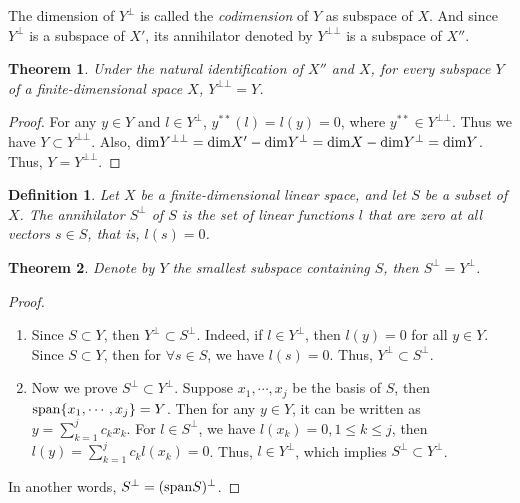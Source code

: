 \documentclass[11pt]{book}
\newtheorem{definition}{Definition}[section]
\newtheorem{theorem}{Theorem}[section]
\theoremstyle{definition}
\numberwithin{equation}{subsection}
\begin{document}
\medskip

The dimension of $Y^\bot$ is called the \emph{codimension} of $Y$ as subspace of $X$. And since $Y^\bot$ is a subspace of $X'$, its annihilator denoted by $Y^{\bot \bot}$ is a subspace of $X''$.

\medskip

\begin{theorem}
Under the natural identification of $X''$ and $X$, for every subspace $Y$ of a finite-dimensional space $X$, $Y^{\bot\bot} = Y$.
\end{theorem}
\begin{proof}
For any $y\in Y$ and $l\in Y^\bot$, $y^{**}(l) = l(y) = 0$, where $y^{**} \in Y^{\bot\bot}$. Thus we have $Y\subset Y^{\bot\bot}$. Also, ${\rm dim}Y^{\bot\bot} = {\rm dim}X' - {\rm dim}Y^\bot = {\rm dim}X - {\rm dim}Y^\bot = {\rm dim}Y$. Thus, $Y = Y^{\bot\bot}$.
\end{proof}

\medskip

\begin{definition}
Let $X$ be a finite-dimensional linear space, and let $S$ be a subset of $X$. The annihilator $S^\bot$ of $S$ is the set of linear functions $l$ that are zero at all vectors $s\in S$, that is, $l(s) = 0$. 
\end{definition}

\medskip

\begin{theorem}
Denote by $Y$ the smallest subspace containing $S$, then $S^\bot = Y^\bot$.
\end{theorem}
\begin{proof}
~\begin{enumerate}[label=(\arabic*)]
    \item Since $S\subset Y$, then $Y^\bot\subset S^\bot$. Indeed, if $l\in Y^\bot$, then $l(y) = 0$ for all $y\in Y$. Since $S\subset Y$, then for $\forall s\in S$, we have $l(s) = 0$. Thus, $Y^\bot\subset S^\bot$. 
    \item Now we prove $S^\bot\subset Y^\bot$. Suppose $x_1,\cdots,x_j$ be the basis of $S$, then ${\rm span}\{x_1,\cdots,x_j\} = Y$. Then for any $y\in Y$, it can be written as $y = \sum^j_{k=1}c_k x_k$. For $l\in S^\bot$, we have $l(x_k) = 0, 1\leq k \leq j$, then $l(y) = \sum^j_{k=1}c_k l(x_k) = 0$. Thus, $l\in Y^\bot$, which implies $S^\bot\subset Y^\bot$. 
\end{enumerate}
In another words, $S^\bot = ({\rm span}S)^\bot$.
\end{proof}
\end{document}
